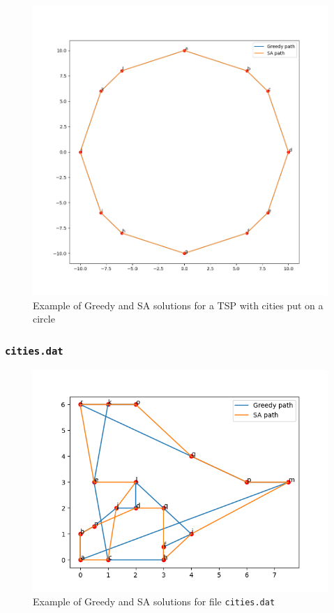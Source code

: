 \documentclass[14pt]
{article}
\begin{document}
\begin{figure}[H] 
\center
\includegraphics[scale=0.3]{img/circle.png}
\caption{\label{circle} Example of Greedy and SA solutions for a TSP with cities put on a circle}
\end{figure}

\subsubsection{\texttt{cities.dat}}

\begin{figure}[H]
\center
\includegraphics[scale=0.5]{img/cities.png}
\caption{Example of Greedy and SA solutions for file \texttt{cities.dat}}
\end{figure}
\end{document}

